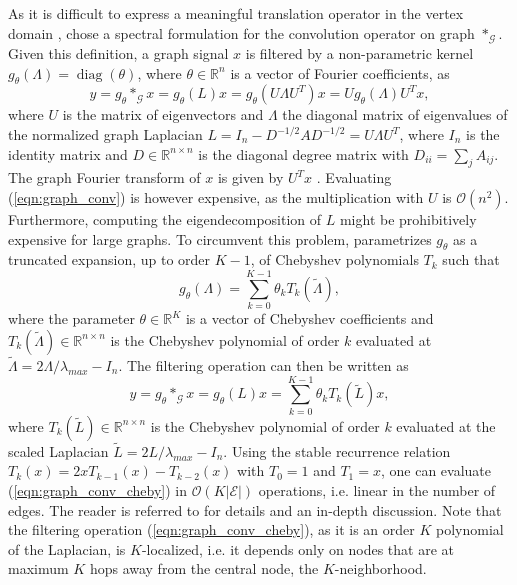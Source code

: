 \documentclass{article} %
\DeclareMathOperator*{\diag}{diag}
\newcommand{\R}{\mathbb{R}}
\newcommand{\bO}{\mathcal{O}}
\newcommand{\G}{\mathcal{G}}
\newcommand{\E}{\mathcal{E}}
\newcommand{\eqnref}[1]{(\ref{eqn:#1})}
\begin{document}
As it is difficult to express a meaningful translation operator in the vertex
domain \citep{gcnn_bruna, gcnn_niepert}, \citet{gcnn} chose a spectral
formulation for the convolution operator on graph $\ast_\G$. Given this
definition, a graph signal $x$ is filtered by a non-parametric kernel
$g_\theta(\Lambda) = \diag(\theta)$, where $\theta \in \R^n$ is a vector of
Fourier coefficients, as
\begin{equation} \label{eqn:graph_conv}
	y = g_\theta \ast_\G x = g_\theta(L) x = g_\theta(U \Lambda U^T) x = U g_\theta(\Lambda) U^T x,
\end{equation}
where $U$ is the matrix of eigenvectors and $\Lambda$ the diagonal matrix of
eigenvalues of the normalized graph Laplacian $L = I_n - D^{-1/2} A D^{-1/2} =
U \Lambda U^T$, where $I_n$ is the identity matrix and $D \in \R^{n \times n}$
is the diagonal degree matrix with $D_{ii} = \sum_j A_{ij}$. The graph Fourier
transform of $x$ is given by $U^Tx$ \citep{gsp}. Evaluating \eqnref{graph_conv}
is however expensive, as the multiplication with $U$ is $\bO(n^2)$. Furthermore,
computing the eigendecomposition of $L$ might be prohibitively expensive for
large graphs. To circumvent this problem, \cite{gcnn} parametrizes $g_\theta$ as a truncated expansion, up to order $K-1$, of Chebyshev polynomials $T_k$
such that
\begin{equation} \label{eq:filt_cheby}
	g_\theta(\Lambda) = \sum_{k=0}^{K-1} \theta_k T_k(\tilde{\Lambda}),
\end{equation}
where the parameter $\theta \in \R^K$ is a vector of Chebyshev coefficients and
$T_k(\tilde{\Lambda}) \in \R^{n \times n}$ is the Chebyshev polynomial of order
$k$ evaluated at $\tilde{\Lambda} = 2 \Lambda / \lambda_{max} - I_n$.
The filtering operation can then be written as
\begin{equation} \label{eqn:graph_conv_cheby}
	y = g_\theta \ast_\G x = g_\theta(L) x = \sum_{k=0}^{K-1} \theta_k T_k(\tilde{L}) x,
\end{equation}
where $T_k(\tilde{L}) \in \R^{n \times n}$ is the Chebyshev polynomial of order
$k$ evaluated at the scaled Laplacian $\tilde{L} = 2 L / \lambda_{max} - I_n$.
Using the stable recurrence relation $T_k(x) = 2x T_{k-1}(x) - T_{k-2}(x)$ with
$T_0 = 1$ and $T_1 = x$, one can evaluate \eqnref{graph_conv_cheby} in
$\bO(K|\E|)$ operations, i.e. linear in the number of edges. The reader is
referred to \cite{gcnn} for details and an in-depth discussion. Note that
the filtering operation \eqnref{graph_conv_cheby}, as it is an order $K$
polynomial of the Laplacian, is $K$-localized, i.e. it depends only on nodes
that are at maximum $K$ hops away from the central node, the $K$-neighborhood.
\end{document}
